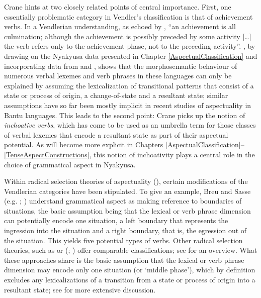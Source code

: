 Crane hints at two closely related points of central importance. First, one essentially problematic category in Vendler's classification is that of achievement verbs. In a Vendlerian understanding, as echoed by \citet[195]{BinnickR1991}, ``an achievement is all culmination; although the achievement is possibly preceded by some activity […] the verb refers only to the achievement phase, not to the preceding activity''. \citet{PersohnB2017b}, by drawing on the Nyakyusa data presented in Chapter \ref{AspectualClassification} and incorporating data from  \citep{KershnerT2002} and  \citep{BotneR2008}, shows that the morphosemantic behaviour of numerous verbal lexemes and verb phrases in these languages can only be explained by assuming the lexicalization of transitional patterns that consist of a state or process of origin, a change-of-state and a resultant state; similar assumptions have so far been mostly implicit in recent studies of aspectuality in Bantu languages. This leads to the second point: Crane picks up the notion of \textit{inchoative verbs}, which has come to be used as an umbrella term for those classes of verbal lexemes that encode a resultant state as part of their aspectual potential. As will become more explicit in Chapters \ref{AspectualClassification}--\ref{TenseAspectConstructions}, this notion of inchoativity plays a central role in the choice of grammatical aspect in Nyakyusa.

Within radical selection theories of aspectuality (), certain modifications of the Vendlerian categories have been stipulated. To give an example, Breu and Sasse (e.g. \citealt{BreuW1984}; \citealt{SasseHJ1991}) understand grammatical aspect as making reference to boundaries of situations, the basic assumption being that the lexical or verb phrase dimension can potentially encode one situation, a left boundary that represents the ingression into the situation and a right boundary, that is, the egression out of the situation. This yields five potential types of verbs. Other radical selection theories, such as \citet{BickelB1997} or \citeauthor{JohansonL1996} (\citeyear{JohansonL1996}; \citeyear{JohansonL2000}) offer comparable classifications; see \citet[48–52]{CroftW2012} for an overview. What these approaches share is the basic assumption that the lexical or verb phrase dimension may encode only one situation (or \lq middle phase'), which by definition excludes any lexicalizations of a transition from a state or process of origin into a resultant state; see \citet{PersohnB2017b} for more extensive discussion.

